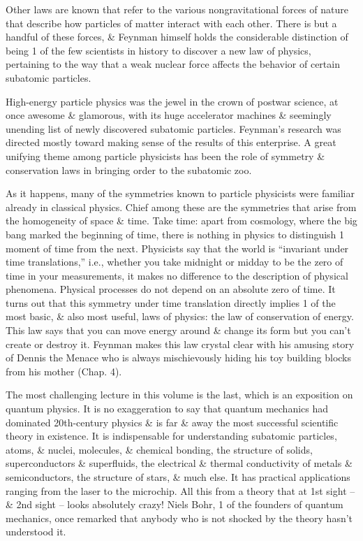\documentclass{article}
\begin{document}
Other laws are known that refer to the various nongravitational forces of nature that describe how particles of matter interact with each other. There is but a handful of these forces, \& {\sc Feynman} himself holds the considerable distinction of being 1 of the few scientists in history to discover a new law of physics, pertaining to the way that a weak nuclear force affects the behavior of certain subatomic particles.

High-energy particle physics was the jewel in the crown of postwar science, at once awesome \& glamorous, with its huge accelerator machines \& seemingly unending list of newly discovered subatomic particles. {\sc Feynman}'s research was directed mostly toward making sense of the results of this enterprise. A great unifying theme among particle physicists has been the role of symmetry \& conservation laws in bringing order to the subatomic zoo.

As it happens, many of the symmetries known to particle physicists were familiar already in classical physics. Chief among these are the symmetries that arise from the homogeneity of space \& time. Take time: apart from cosmology, where the big bang marked the beginning of time, there is nothing in physics to distinguish 1 moment of time from the next. Physicists say that the world is ``invariant under time translations,'' i.e., whether you take midnight or midday to be the zero of time in your measurements, it makes no difference to the description of physical phenomena. Physical processes do not depend on an absolute zero of time. It turns out that this symmetry under time translation directly implies 1 of the most basic, \& also most useful, laws of physics: the law of conservation of energy. This law says that you can move energy around \& change its form but you can't create or destroy it. {\sc Feynman} makes this law crystal clear with his amusing story of {\sc Dennis} the Menace who is always mischievously hiding his toy building blocks from his mother (Chap. 4).

The most challenging lecture in this volume is the last, which is an exposition on quantum physics. It is no exaggeration to say that quantum mechanics had dominated 20th-century physics \& is far \& away the most successful scientific theory in existence. It is indispensable for understanding subatomic particles, atoms, \& nuclei, molecules, \& chemical bonding, the structure of solids, superconductors \& superfluids, the electrical \& thermal conductivity of metals \& semiconductors, the structure of stars, \& much else. It has practical applications ranging from the laser to the microchip. All this from a theory that at 1st sight -- \& 2nd sight -- looks absolutely crazy! {\sc Niels Bohr}, 1 of the founders of quantum mechanics, once remarked that anybody who is not shocked by the theory hasn't understood it.
\end{document}
